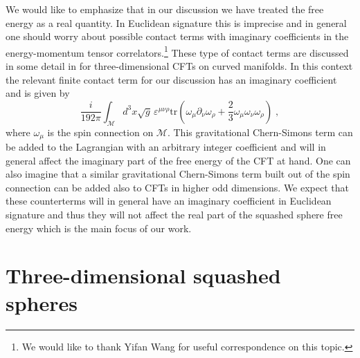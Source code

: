 \documentclass[12pt]{article}
\numberwithin{equation}{section}
\begin{document}
We would like to emphasize that in our discussion we have treated the free energy as a real quantity. In Euclidean signature this is imprecise and in general one should worry about possible contact terms with imaginary coefficients in the energy-momentum tensor correlators.\footnote{We would like to thank Yifan Wang for useful correspondence on this topic.} These type of contact terms are discussed in some detail in \cite{Closset:2012vg,Closset:2012vp} for three-dimensional CFTs on curved manifolds. In this context the relevant finite contact term for our discussion has an imaginary coefficient and is given by
%
\begin{equation}
\frac{i}{192\pi}\int_{\mathcal{M}}d^3x\sqrt{g}\,\varepsilon^{\mu\nu\rho} \text{tr}\left(\omega_{\mu}\partial_{\nu}\omega_{\rho}+\frac{2}{3}\omega_{\mu}\omega_{\nu}\omega_{\rho}\right)\;,
\end{equation}
%
where $\omega_{\mu}$ is the spin connection on $\mathcal{M}$. This gravitational Chern-Simons term can be added to the Lagrangian with an arbitrary integer coefficient and will in general affect the imaginary part of the free energy of the CFT at hand. One can also imagine that a similar gravitational Chern-Simons term built out of the spin connection can be added also to CFTs in higher odd dimensions. We expect that these counterterms will in general have an imaginary coefficient in Euclidean signature and thus they will not affect the real part of the squashed sphere free energy which is the main focus of our work.

\section{Three-dimensional squashed spheres}
\label{sec:3}
\end{document}
